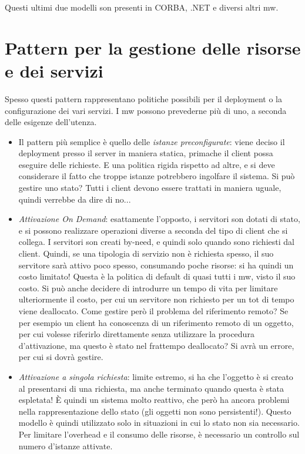 Questi ultimi due modelli son presenti in CORBA, .NET e diversi altri mw.

\section{Pattern per la gestione delle risorse e dei servizi}
Spesso questi pattern rappresentano politiche possibili per il deployment o la configurazione dei vari servizi. I mw
possono prevederne più di uno, a seconda delle esigenze dell'utenza.
\begin{itemize}
 \item Il pattern più semplice è quello delle \textit{istanze preconfigurate}: viene deciso il deployment presso il
 server in maniera statica, primache il client possa eseguire delle richieste. E una politica rigida rispetto ad altre,
 e si deve considerare il fatto che troppe istanze potrebbero ingolfare il sistema. Si può gestire uno stato? Tutti i
 client devono essere trattati in maniera uguale, quindi verrebbe da dire di no...
 \item \textit{Attivazione On Demand}: esattamente l'opposto, i servitori son dotati di stato, e si possono realizzare
 operazioni diverse a seconda del tipo di client che si collega. I servitori son creati by-need, e quindi solo quando
 sono richiesti dal client. Quindi, se una tipologia di servizio non è richiesta spesso, il suo servitore sarà attivo
 poco spesso, consumando poche risorse: si ha quindi un costo limitato! Questa è la politica di default di quasi tutti
 i mw, visto il suo costo.
 Si può anche decidere di introdurre un tempo di vita per limitare ulteriormente il costo, per cui un servitore non
 richiesto per un tot di tempo viene deallocato.
 Come gestire però il problema del riferimento remoto? Se per esempio un client ha conoscenza di un riferimento remoto
 di un oggetto, per cui volesse riferirlo direttamente senza utilizzare la procedura d'attivazione, ma questo è stato
 nel frattempo deallocato? Si avrà un errore, per cui si dovrà gestire.
 \item \textit{Attivazione a singola richiesta}: limite estremo, si ha che l'oggetto è si creato al presentarsi di una
 richiesta, ma anche terminato quando questa è stata espletata! È quindi un sistema molto reattivo, che però ha ancora
 problemi nella rappresentazione dello stato (gli oggetti non sono persistenti!). Questo modello è quindi utilizzato
 solo in situazioni in cui lo stato non sia necessario. Per limitare l'overhead e il consumo delle risorse, è
 necessario un controllo sul numero d'istanze attivate.

\end{itemize}
